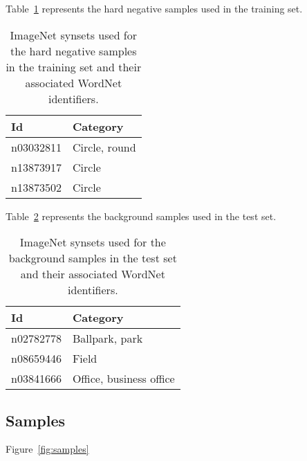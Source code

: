 \documentclass{llncs}
\begin{document}
{		Table~\ref{tab:negative_samples} represents the hard negative samples used in the training set.

		\begin{table}
			\centering
			\caption{ImageNet synsets used for the hard negative samples in the training set and their associated WordNet identifiers.}
			\label{tab:negative_samples}
			\begin{tabularx}{\textwidth}{lX}
				\toprule
				\textbf{Id} & \textbf{Category} \\
				\midrule
					n03032811 & Circle, round \\
					n13873917 & Circle \\
					n13873502 & Circle \\
				\bottomrule
			\end{tabularx}
		\end{table}

		Table~\ref{tab:background_samples} represents the background samples used in the test set.

		\begin{table}
			\centering
			\caption{ImageNet synsets used for the background samples in the test set and their associated WordNet identifiers.}
			\label{tab:background_samples}
			\begin{tabularx}{\textwidth}{lX}
				\toprule
				\textbf{Id} & \textbf{Category} \\
				\midrule
					n02782778 & Ballpark, park \\
					n08659446 & Field \\
					n03841666 & Office, business office \\
				\bottomrule
			\end{tabularx}
		\end{table}

		\subsection{Samples} {

			Figure~\ref{fig:samples}

			\newcommand{\samplefigurewidth}{0.45\textwidth}
			\newcommand{\samplewidth}{0.14\textwidth}
			\newcommand{\sampleheight}{1.5cm}
			\newcommand{\includesample}[1]{\hspace{0.1cm}\texttt{[image: images/training/\#1]}}

}}
\end{document}

